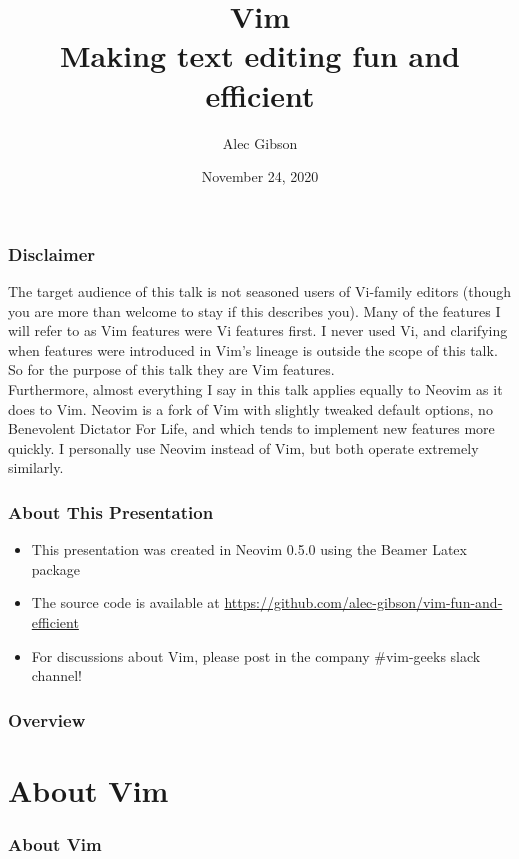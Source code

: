 \documentclass{beamer}
\title[\textcolor{white}{Vim - Fun and Efficient}]{\huge Vim \\
    \large Making text editing fun and efficient
}
\author{Alec Gibson}
\institute[BlueCat]
{
    BlueCat Networks \\
    \medskip
    \textit{agibson@bluecatnetworks.com}
}
\date{November 24, 2020}
\begin{document}
\begin{frame}[fragile]
    \titlepage %
\end{frame}

\begin{frame}[fragile]
    \frametitle{Disclaimer}
    \small The target audience of this talk is not seasoned users of Vi-family editors (though you are more than welcome to stay if this describes you). Many of the features I will refer to as Vim features were Vi features first. I never used Vi, and clarifying when features were introduced in Vim's lineage is outside the scope of this talk. So for the purpose of this talk they are Vim features.\\
    \vspace{0.5cm}
    Furthermore, almost everything I say in this talk applies equally to Neovim as it does to Vim. Neovim is a fork of Vim with slightly tweaked default options, no Benevolent Dictator For Life, and which tends to implement new features more quickly. I personally use Neovim instead of Vim, but both operate extremely similarly.
\end{frame}

\begin{frame}[fragile]
    \frametitle{About This Presentation}
    \begin{itemize}
	\item This presentation was created in Neovim 0.5.0 using the Beamer Latex package
	\item The source code is available at \url{https://github.com/alec-gibson/vim-fun-and-efficient}
	\item For discussions about Vim, please post in the company \#vim-geeks slack channel!
    \end{itemize}
\end{frame}

\begin{frame}[fragile]
    \frametitle{Overview}
    \tableofcontents
\end{frame}

\section{About Vim}

\begin{frame}[fragile]
    \frametitle{About Vim}
    \tableofcontents[currentsection]
\end{frame}
\end{document}
